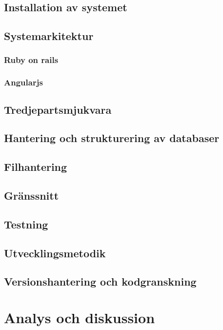 \documentclass[a4paper,12pt,oneside,final]{extbook}
\begin{document}
\section{Installation av systemet}

\section{Systemarkitektur}

\subsection{Ruby on rails}

\subsection{Angularjs}

\section{Tredjepartsmjukvara}

\section{Hantering och strukturering av databaser}

\section{Filhantering}

\section{Gränssnitt}

\section{Testning}

\section{Utvecklingsmetodik}

\section{Versionshantering och kodgranskning}

\chapter{Analys och diskussion}
\end{document}
